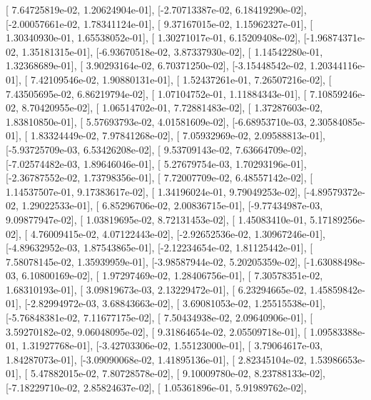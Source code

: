 \documentclass{article}
\begin{document}
       [ 7.64725819e-02,  1.20624904e-01],
       [-2.70713387e-02,  6.18419290e-02],
       [-2.00057661e-02,  1.78341124e-01],
       [ 9.37167015e-02,  1.15962327e-01],
       [ 1.30340930e-01,  1.65538052e-01],
       [ 1.30271017e-01,  6.15209408e-02],
       [-1.96874371e-02,  1.35181315e-01],
       [-6.93670518e-02,  3.87337930e-02],
       [ 1.14542280e-01,  1.32368689e-01],
       [ 3.90293164e-02,  6.70371250e-02],
       [-3.15448542e-02,  1.20344116e-01],
       [ 7.42109546e-02,  1.90880131e-01],
       [ 1.52437261e-01,  7.26507216e-02],
       [ 7.43505695e-02,  6.86219794e-02],
       [ 1.07104752e-01,  1.11884343e-01],
       [ 7.10859246e-02,  8.70420955e-02],
       [ 1.06514702e-01,  7.72881483e-02],
       [ 1.37287603e-02,  1.83810850e-01],
       [ 5.57693793e-02,  4.01581609e-02],
       [-6.68953710e-03,  2.30584085e-01],
       [ 1.83324449e-02,  7.97841268e-02],
       [ 7.05932969e-02,  2.09588813e-01],
       [-5.93725709e-03,  6.53426208e-02],
       [ 9.53709143e-02,  7.63664709e-02],
       [-7.02574482e-03,  1.89646046e-01],
       [ 5.27679754e-03,  1.70293196e-01],
       [-2.36787552e-02,  1.73798356e-01],
       [ 7.72007709e-02,  6.48557142e-02],
       [ 1.14537507e-01,  9.17383617e-02],
       [ 1.34196024e-01,  9.79049253e-02],
       [-4.89579372e-02,  1.29022533e-01],
       [ 6.85296706e-02,  2.00836715e-01],
       [-9.77434987e-03,  9.09877947e-02],
       [ 1.03819695e-02,  8.72131453e-02],
       [ 1.45083410e-01,  5.17189256e-02],
       [ 4.76009415e-02,  4.07122443e-02],
       [-2.92652536e-02,  1.30967246e-01],
       [-4.89632952e-03,  1.87543865e-01],
       [-2.12234654e-02,  1.81125442e-01],
       [ 7.58078145e-02,  1.35939959e-01],
       [-3.98587944e-02,  5.20205359e-02],
       [-1.63088498e-03,  6.10800169e-02],
       [ 1.97297469e-02,  1.28406756e-01],
       [ 7.30578351e-02,  1.68310193e-01],
       [ 3.09819673e-03,  2.13229472e-01],
       [ 6.23294665e-02,  1.45859842e-01],
       [-2.82994972e-03,  3.68843663e-02],
       [ 3.69081053e-02,  1.25515538e-01],
       [-5.76848381e-02,  7.11677175e-02],
       [ 7.50434938e-02,  2.09640906e-01],
       [ 3.59270182e-02,  9.06048095e-02],
       [ 9.31864654e-02,  2.05509718e-01],
       [ 1.09583388e-01,  1.31927768e-01],
       [-3.42703306e-02,  1.55123000e-01],
       [ 3.79064617e-03,  1.84287073e-01],
       [-3.09090068e-02,  1.41895136e-01],
       [ 2.82345104e-02,  1.53986653e-01],
       [ 5.47882015e-02,  7.80728578e-02],
       [ 9.10009780e-02,  8.23788133e-02],
       [-7.18229710e-02,  2.85824637e-02],
       [ 1.05361896e-01,  5.91989762e-02],
\end{document}
